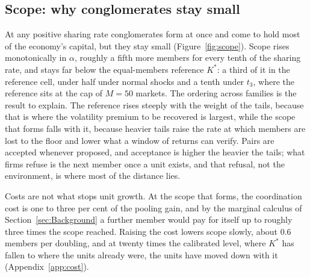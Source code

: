 \subsection{Scope: why conglomerates stay small}\label{sec:results-scope}

At any positive sharing rate conglomerates form at once and come to hold most of the economy's capital, but they stay small (Figure~\ref{fig:scope}). Scope rises monotonically in $\alpha$, roughly a fifth more members for every tenth of the sharing rate, and stays far below the equal-members reference $K^*$: a third of it in the reference cell, under half under normal shocks and a tenth under $t_3$, where the reference sits at the cap of $M = 50$ markets. The ordering across families is the result to explain. The reference rises steeply with the weight of the tails, because that is where the volatility premium to be recovered is largest, while the scope that forms falls with it, because heavier tails raise the rate at which members are lost to the floor and lower what a window of returns can verify. Pairs are accepted whenever proposed, and acceptance is higher the heavier the tails; what firms refuse is the next member once a unit exists, and that refusal, not the environment, is where most of the distance lies.



Costs are not what stops unit growth. At the scope that forms, the coordination cost is one to three per cent of the pooling gain, and by the marginal calculus of Section~\ref{sec:Background} a further member would pay for itself up to roughly three times the scope reached. Raising the cost lowers scope slowly, about 0.6 members per doubling, and at twenty times the calibrated level, where $K^*$ has fallen to where the units already were, the units have moved down with it (Appendix~\ref{app:cost}).

